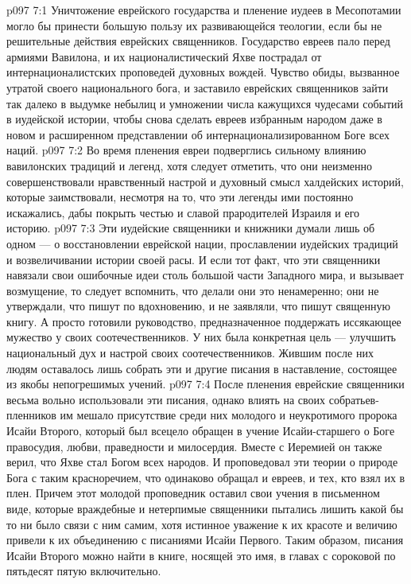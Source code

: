\vs p097 7:1 Уничтожение еврейского государства и пленение иудеев в Месопотамии могло бы принести большую пользу их развивающейся теологии, если бы не решительные действия еврейских священников. Государство евреев пало перед армиями Вавилона, и их националистический Яхве пострадал от интернационалистских проповедей духовных вождей. Чувство обиды, вызванное утратой своего национального бога, и заставило еврейских священников зайти так далеко в выдумке небылиц и умножении числа кажущихся чудесами событий в иудейской истории, чтобы снова сделать евреев избранным народом даже в новом и расширенном представлении об интернационализированном Боге всех наций.
\vs p097 7:2 Во время пленения евреи подверглись сильному влиянию вавилонских традиций и легенд, хотя следует отметить, что они неизменно совершенствовали нравственный настрой и духовный смысл халдейских историй, которые заимствовали, несмотря на то, что эти легенды ими постоянно искажались, дабы покрыть честью и славой прародителей Израиля и его историю.
\vs p097 7:3 Эти иудейские священники и книжники думали лишь об одном --- о восстановлении еврейской нации, прославлении иудейских традиций и возвеличивании истории своей расы. И если тот факт, что эти священники навязали свои ошибочные идеи столь большой части Западного мира, и вызывает возмущение, то следует вспомнить, что делали они это ненамеренно; они не утверждали, что пишут по вдохновению, и не заявляли, что пишут священную книгу. А просто готовили руководство, предназначенное поддержать иссякающее мужество у своих соотечественников. У них была конкретная цель --- улучшить национальный дух и настрой своих соотечественников. Жившим после них людям оставалось лишь собрать эти и другие писания в наставление, состоящее из якобы непогрешимых учений.
\vs p097 7:4 После пленения еврейские священники весьма вольно использовали эти писания, однако влиять на своих собратьев\hyp{}пленников им мешало присутствие среди них молодого и неукротимого пророка Исайи Второго, который был всецело обращен в учение Исайи\hyp{}старшего о Боге правосудия, любви, праведности и милосердия. Вместе с Иеремией он также верил, что Яхве стал Богом всех народов. И проповедовал эти теории о природе Бога с таким красноречием, что одинаково обращал и евреев, и тех, кто взял их в плен. Причем этот молодой проповедник оставил свои учения в письменном виде, которые враждебные и нетерпимые священники пытались лишить какой бы то ни было связи с ним самим, хотя истинное уважение к их красоте и величию привели к их объединению с писаниями Исайи Первого. Таким образом, писания Исайи Второго можно найти в книге, носящей это имя, в главах с сороковой по пятьдесят пятую включительно.
